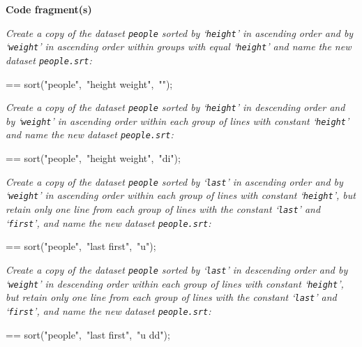 \documentclass{book}
\makeatletter
\newenvironment{Texinfopreformatted}{%
  \par\GNUTobeylines\obeyspaces\frenchspacing\parskip=\z@\parindent=\z@}{}
{\catcode`\^^M=13 \gdef\GNUTobeylines{\catcode`\^^M=13 \def^^M{\null\par}}}
\newenvironment{Texinfoindented}{\begin{list}{}{}\item\relax}{\end{list}}
\renewcommand{\_}{\Texinfounderscore\discretionary{}{}{}}
\makeatother
\begin{document}
\noindent{}\textbf{Code fragment(s)}

\emph{Create a copy of the dataset \texttt{people} sorted by `\texttt{height}'
in ascending order and by `\texttt{weight}' in ascending order within
groups with equal `\texttt{height}' and name
the new dataset \texttt{people.srt}:}
\begin{Texinfoindented}
\begin{Texinfopreformatted}%
\ttfamily sort("people",\ "height weight",\ "");
\end{Texinfopreformatted}
\end{Texinfoindented}

\emph{Create a copy of the dataset \texttt{people} sorted by `\texttt{height}'
in descending order and by `\texttt{weight}' in ascending order within
each group of lines with constant `\texttt{height}' and name
the new dataset \texttt{people.srt}:}
\begin{Texinfoindented}
\begin{Texinfopreformatted}%
\ttfamily sort("people",\ "height weight",\ "di");
\end{Texinfopreformatted}
\end{Texinfoindented}

\emph{Create a copy of the dataset \texttt{people} sorted by `\texttt{last}'
in ascending order and by `\texttt{weight}' in ascending order within
each group of lines with constant `\texttt{height}', but retain only one line from
each group of lines with the constant `\texttt{last}' and `\texttt{first}',
and name the new dataset \texttt{people.srt}:}
\begin{Texinfoindented}
\begin{Texinfopreformatted}%
\ttfamily sort("people",\ "last first",\ "u");
\end{Texinfopreformatted}
\end{Texinfoindented}

\emph{Create a copy of the dataset \texttt{people} sorted by `\texttt{last}'
in descending order and by `\texttt{weight}' in descending order within
each group of lines with constant `\texttt{height}', but retain only one line from
each group of lines with the constant `\texttt{last}' and `\texttt{first}',
and name the new dataset \texttt{people.srt}:}
\begin{Texinfoindented}
\begin{Texinfopreformatted}%
\ttfamily sort("people",\ "last first",\ "u dd");
\end{Texinfopreformatted}
\end{Texinfoindented}
\end{document}
